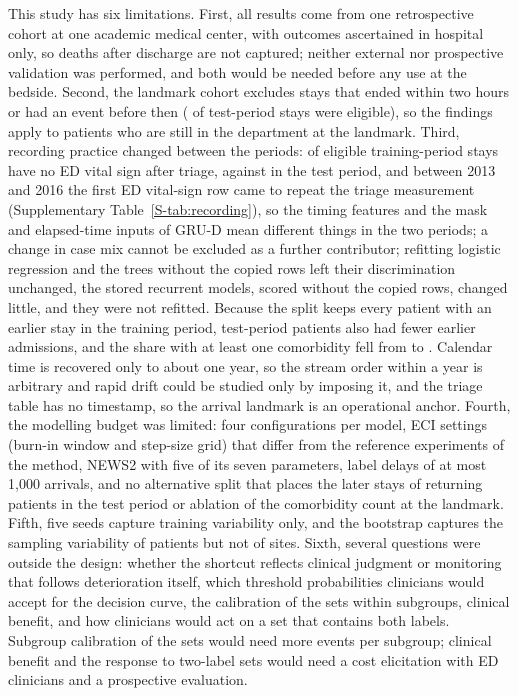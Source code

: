 This study has six limitations. First, all results come from one retrospective cohort at one academic medical center, with outcomes ascertained in hospital only, so
deaths after discharge are not captured; neither external nor prospective validation was performed, and both would be needed before any use at the bedside. Second, the
landmark cohort excludes stays that ended within two hours or had an event before then (\RVHtwoTestEligible{} of \RVHtwoTestStays{} test-period stays were eligible), so the findings apply to
patients who are still in the department at the landmark. Third, recording practice changed between the periods: \RVZeroRowsTrainPct{} of eligible training-period stays
have no ED vital sign after triage, against \RVZeroRowsTestPct{} in the test period, and between 2013 and 2016 the first ED vital-sign row came to repeat the triage measurement (Supplementary Table~\ref{S-tab:recording}), so the timing features and the mask and elapsed-time inputs of GRU-D mean different things in the two periods; a change in case mix cannot be excluded as a further contributor; refitting logistic regression and the trees without the copied rows left their discrimination unchanged, the stored recurrent models, scored without the copied rows, changed little, and they were not refitted. Because the split keeps every patient with an earlier stay in the training period, test-period patients also had fewer earlier admissions, and the share with at least one comorbidity fell from \RVCharTrainElixPct{} to \RVCharTestElixPct{}. Calendar time is
recovered only to about one year, so the stream order within a year is arbitrary and rapid drift could be studied only by imposing it, and the triage table has no
timestamp, so the arrival landmark is an operational anchor. Fourth, the modelling budget was limited: four configurations per model, ECI settings (burn-in window and
step-size grid) that differ from the reference experiments of the method, NEWS2 with five of its seven parameters, label delays of at most 1{,}000 arrivals, and no alternative split that places the later stays of returning patients in the test period or ablation of the comorbidity count at the landmark. Fifth,
five seeds capture training variability only, and the bootstrap captures the sampling variability of patients but not of sites. Sixth, several questions were outside the
design: whether the shortcut reflects clinical judgment or monitoring that follows deterioration itself, which threshold probabilities clinicians would accept for the
decision curve, the calibration of the sets within subgroups, clinical benefit, and how clinicians would act on a set that contains both labels. Subgroup calibration of the sets would need more
events per subgroup; clinical benefit and the response to two-label sets would need a cost elicitation with ED clinicians and a prospective evaluation.
